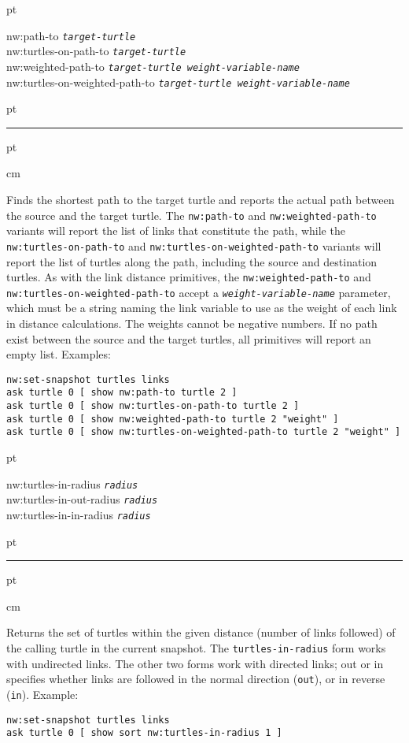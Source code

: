 \documentclass[10pt]{article}
\newenvironment{prim}{
  \vskip 6 pt
  \ttfamily
  \bfseries
}{
  \vskip 2 pt
  \hrule
  \vskip 6 pt
}
\newenvironment{doc}{
  \leftskip 0.5 cm
}
{}
\newcommand{\param}[1]{\texttt{\textit{\textmd{#1}}}}
\begin{document}
\begin{prim}
nw:path-to \param{target-turtle}\\
nw:turtles-on-path-to \param{target-turtle}\\
nw:weighted-path-to \param{target-turtle weight-variable-name}\\
nw:turtles-on-weighted-path-to \param{target-turtle weight-variable-name}
\end{prim}

\begin{doc}
Finds the shortest path to the target turtle and reports the actual path between
the source and the target turtle. The \texttt{nw:path-to} and
\texttt{nw:weighted-path-to} variants will report the list of links that
constitute the path, while the \texttt{nw:turtles-on-path-to} and
\texttt{nw:turtles-on-weighted-path-to} variants will report the list of turtles
along the path, including the source and destination turtles.
As with the link distance primitives, the \texttt{nw:weighted-path-to} and
\texttt{nw:turtles-on-weighted-path-to} accept a \param{weight-variable-name}
parameter, which must be a string naming the link variable to use as the weight
of each link in distance calculations. The weights cannot be negative numbers.
If no path exist between the source and the target turtles, all primitives will
report an empty list. Examples:

\begin{Verbatim}
nw:set-snapshot turtles links
ask turtle 0 [ show nw:path-to turtle 2 ]
ask turtle 0 [ show nw:turtles-on-path-to turtle 2 ]
ask turtle 0 [ show nw:weighted-path-to turtle 2 "weight" ]
ask turtle 0 [ show nw:turtles-on-weighted-path-to turtle 2 "weight" ]
\end{Verbatim}
\end{doc}

\begin{prim}
nw:turtles-in-radius \param{radius}\\
nw:turtles-in-out-radius \param{radius}\\
nw:turtles-in-in-radius \param{radius}
\end{prim}

\begin{doc}
Returns the set of turtles within the given distance (number of links followed)
of the calling turtle in the current snapshot.
The \texttt{turtles-in-radius} form works with undirected links. The other two
forms work with directed links; out or in specifies whether links are followed
in the normal direction (\texttt{out}), or in reverse (\texttt{in}). Example:

\begin{Verbatim}
nw:set-snapshot turtles links
ask turtle 0 [ show sort nw:turtles-in-radius 1 ]
\end{Verbatim}
\end{doc}
\end{document}
